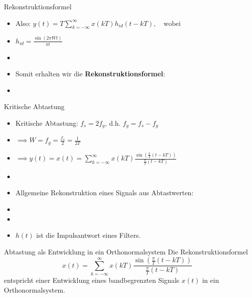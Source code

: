\documentclass[14pt, aspectratio=169, handout]{beamer}
\begin{document}
\begin{frame}{Rekonstruktionsformel}
    \begin{itemize}
        \item[] Also: $y(t) = T \displaystyle\sum_{k = -\infty}^{\infty} x(kT) h_{id}(t-kT), \hspace{12pt} \text{wobei}$
        \item[] $h_{id} = \displaystyle\frac{\sin(2 \pi W t)}{\pi t}$
        \item[] 
        \item[]  Somit erhalten wir die \textbf{Rekonstruktionsformel}:
        \item[] 
    \end{itemize}
\end{frame}

\begin{frame}{Kritische Abtastung}
    \begin{itemize}
    \item Kritische Abtastung: $f_s = 2 f_g$, d.h. $f_g = f_s - f_g$
    \item[] $\implies W = f_g = \frac{f_s}{2} = \frac{1}{2T}$
    \item[] $\implies y(t) = x(t) = \displaystyle\sum_{k=-\infty}^\infty x(kT)\displaystyle\frac{\sin\left(\frac{\pi}{T}(t-kT)\right)}{\frac{\pi}{T}(t-kT)}$
    \item[] 
    \item Allgemeine Rekonstruktion eines Signals aus Abtastwerten:
    \item[] 
    \item[] 
    \item $h(t)$ ist die Impulsantwort eines Filters.
\end{itemize}
\end{frame}

\begin{frame}{Abtastung als Entwicklung in ein Orthonormalsystem}
    Die Rekonstruktionsformel
    $$x(t) = \sum_{k=-\infty}^\infty x(kT)\displaystyle\frac{\sin\left(\frac{\pi}{T}(t-kT)\right)}{\frac{\pi}{T}(t-kT)}$$
    entspricht einer Entwicklung eines bandbegrenzten Signals $x(t)$ in ein Orthonormalsystem.
\end{frame}
\end{document}
